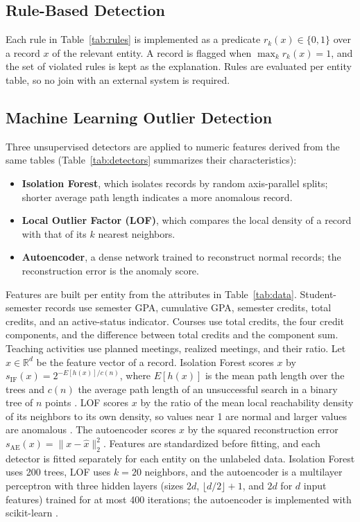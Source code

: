 \documentclass[conference]{IEEEtran}
\begin{document}
\subsection{Rule-Based Detection}
Each rule in Table~\ref{tab:rules} is implemented as a predicate $r_k(x)\in\{0,1\}$ over a record $x$ of the relevant entity. A record is flagged when $\max_k r_k(x)=1$, and the set of violated rules is kept as the explanation. Rules are evaluated per entity table, so no join with an external system is required.

\subsection{Machine Learning Outlier Detection}
Three unsupervised detectors are applied to numeric features derived from the same tables (Table~\ref{tab:detectors} summarizes their characteristics):
\begin{itemize}
\item \textbf{Isolation Forest}, which isolates records by random axis-parallel splits; shorter average path length indicates a more anomalous record.
\item \textbf{Local Outlier Factor (LOF)}, which compares the local density of a record with that of its $k$ nearest neighbors.
\item \textbf{Autoencoder}, a dense network trained to reconstruct normal records; the reconstruction error is the anomaly score.
\end{itemize}
Features are built per entity from the attributes in Table~\ref{tab:data}. Student-semester records use semester GPA, cumulative GPA, semester credits, total credits, and an active-status indicator. Courses use total credits, the four credit components, and the difference between total credits and the component sum. Teaching activities use planned meetings, realized meetings, and their ratio. Let $x\in\mathbb{R}^d$ be the feature vector of a record. Isolation Forest scores $x$ by $s_{\mathrm{IF}}(x)=2^{-E[h(x)]/c(n)}$, where $E[h(x)]$ is the mean path length over the trees and $c(n)$ the average path length of an unsuccessful search in a binary tree of $n$ points \cite{liu2008iforest}. LOF scores $x$ by the ratio of the mean local reachability density of its neighbors to its own density, so values near 1 are normal and larger values are anomalous \cite{breunig2000lof}. The autoencoder scores $x$ by the squared reconstruction error $s_{\mathrm{AE}}(x)=\lVert x-\hat{x}\rVert_2^2$. Features are standardized before fitting, and each detector is fitted separately for each entity on the unlabeled data. Isolation Forest uses 200 trees, LOF uses $k=20$ neighbors, and the autoencoder is a multilayer perceptron with three hidden layers (sizes $2d$, $\lfloor d/2\rfloor+1$, and $2d$ for $d$ input features) trained for at most 400 iterations; the autoencoder is implemented with scikit-learn \cite{scikit-learn}.
\end{document}
